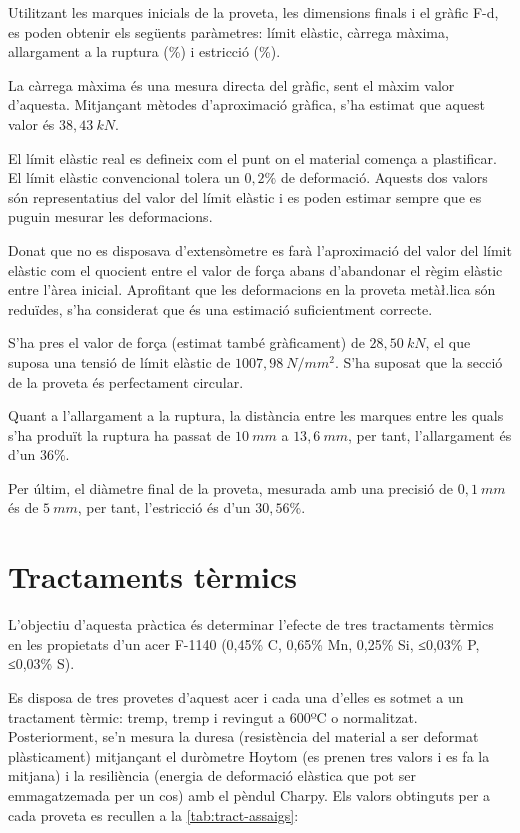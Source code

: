 \documentclass[a4paper]{report}
\begin{document}
Utilitzant les marques inicials de la proveta, les dimensions finals i el gràfic F-d, es poden obtenir els següents paràmetres: límit elàstic, càrrega màxima, allargament a la ruptura (\%) i estricció (\%).

La càrrega màxima és una mesura directa del gràfic, sent el màxim valor d'aquesta. Mitjançant mètodes d'aproximació gràfica, s'ha estimat que aquest valor és $38,43 \ kN$.

El límit elàstic real es defineix com el punt on el material comença a plastificar. El límit elàstic convencional tolera un $0,2\%$ de deformació. Aquests dos valors són representatius del valor del límit elàstic i es poden estimar sempre que es puguin mesurar les deformacions. 

Donat que no es disposava d'extensòmetre es farà l'aproximació del valor del límit elàstic com el quocient entre el valor de força abans d'abandonar el règim elàstic entre l'àrea inicial. Aprofitant que les deformacions en la proveta metà\l.lica són reduïdes, s'ha considerat que és una estimació suficientment correcte.

S'ha pres el valor de força (estimat també gràficament) de $28,50 \ kN$, el que suposa una tensió de límit elàstic de $1007,98 \ N/mm^2$. S'ha suposat que la secció de la proveta és perfectament circular.

Quant a l'allargament a la ruptura, la distància entre les marques entre les quals s'ha produït la ruptura ha passat de $10 \ mm$ a $13,6 \ mm$, per tant, l'allargament és d'un $36\%$.

Per últim, el diàmetre final de la proveta, mesurada amb una precisió de $0,1 \ mm$ és de $5 \ mm$, per tant, l'estricció és d'un $30,56\%$.

\chapter{Tractaments tèrmics}

L'objectiu d'aquesta pràctica és determinar l'efecte de tres tractaments tèrmics en les propietats d'un acer F-1140 (0,45\% C, 0,65\% Mn, 0,25\% Si, ≤0,03\% P, ≤0,03\% S). 

Es disposa de tres provetes d'aquest acer i cada una d'elles es sotmet a un tractament tèrmic: tremp, tremp i revingut a 600ºC o normalitzat. Posteriorment, se'n mesura la duresa (resistència del material a ser deformat plàsticament) mitjançant el duròmetre Hoytom (es prenen tres valors i es fa la mitjana) i la resiliència (energia de deformació elàstica que pot ser emmagatzemada per un cos) amb el pèndul Charpy. Els valors obtinguts per a cada proveta es recullen a la \autoref{tab:tract-assaigs}:
\end{document}
